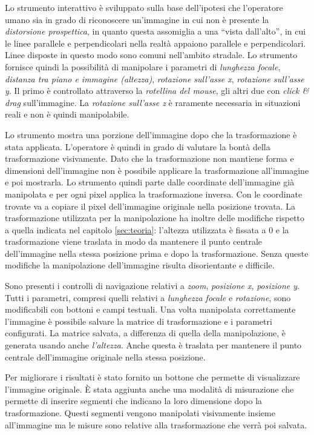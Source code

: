 Lo strumento interattivo è sviluppato sulla base dell'ipotesi che l'operatore umano sia in grado di riconoscere un'immagine in cui non è presente la \emph{distorsione prospettica}, in quanto questa assomiglia a una ``vista dall'alto'', in cui le linee parallele e perpendicolari nella realtà appaiono parallele e perpendicolari. 
Linee disposte in questo modo sono comuni nell'ambito stradale.
Lo strumento fornisce quindi la possibilità di manipolare i parametri di \emph{lunghezza focale}, \emph{distanza tra piano e immagine (altezza)}, \emph{rotazione sull'asse x}, \emph{rotazione sull'asse y}.
Il primo è controllato attraverso la \emph{rotellina del mouse}, gli altri due con \emph{click \& drag} sull'immagine.
La \emph{rotazione sull'asse z} è raramente necessaria in situazioni reali e non è quindi manipolabile.

Lo strumento mostra una porzione dell'immagine dopo che la trasformazione è stata applicata.
L'operatore è quindi in grado di valutare la bontà della trasformazione visivamente.
Dato che la trasformazione non mantiene forma e dimensioni dell'immagine non è possibile applicare la trasformazione all'immagine e poi mostrarla.
Lo strumento quindi parte dalle coordinate dell'immagine già manipolata e per ogni pixel applica la trasformazione inversa.
Con le coordinate trovate va a copiare il pixel dell'immagine originale nella posizione trovata.
La trasformazione utilizzata per la manipolazione ha inoltre delle modifiche rispetto a quella indicata nel capitolo \ref{sec:teoria}: l'altezza utilizzata è fissata a 0 e la trasformazione viene traslata in modo da mantenere il punto centrale dell'immagine nella stessa posizione prima e dopo la trasformazione.
Senza queste modifiche la manipolazione dell'immagine risulta disorientante e difficile.

Sono presenti i controlli di navigazione relativi a \emph{zoom}, \emph{posizione x}, \emph{posizione y}.
Tutti i parametri, compresi quelli relativi a \emph{lunghezza focale} e \emph{rotazione}, sono modificabili con bottoni e campi testuali.
Una volta manipolata correttamente l'immagine è possibile salvare la matrice di trasformazione e i parametri configurati.
La matrice salvata, a differenza di quella della manipolazione, è generata usando anche \emph{l'altezza}.
Anche questa è traslata per mantenere il punto centrale dell'immagine originale nella stessa posizione.

Per migliorare i risultati è stato fornito un bottone che permette di visualizzare l'immagine originale.
È stata aggiunta anche una modalità di misurazione che permette di inserire segmenti che indicano la loro dimensione dopo la trasformazione.
Questi segmenti vengono manipolati visivamente insieme all'immagine ma le misure sono relative alla trasformazione che verrà poi salvata.
